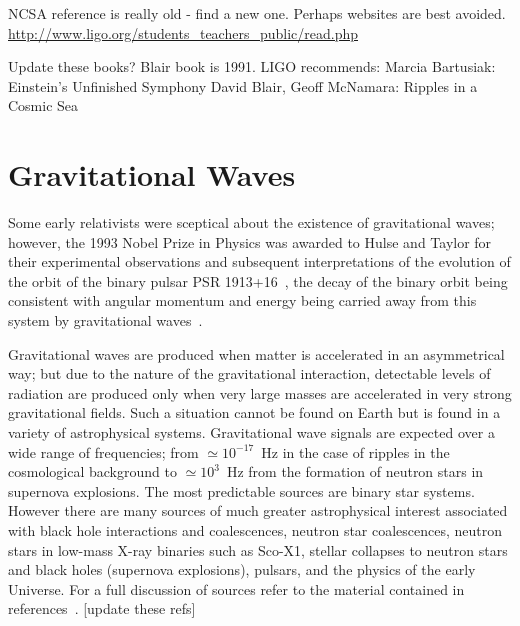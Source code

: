 \documentclass{article}
\begin{document}
NCSA reference is really old - find a new one. Perhaps websites are best avoided.
\url{http://www.ligo.org/students_teachers_public/read.php}

Update these books?  Blair book is 1991.  LIGO recommends:
Marcia Bartusiak: Einstein's Unfinished Symphony
David Blair, Geoff McNamara: Ripples in a Cosmic Sea


\newpage

\section{Gravitational Waves}
\label{section:gravwaves}

Some early relativists were sceptical about the existence of gravitational
waves; however, the 1993 Nobel Prize in Physics was awarded to Hulse and Taylor
for their experimental observations and subsequent interpretations of the
evolution of the orbit of the binary pulsar PSR 1913+16~\cite{Hulse, Taylor},
the decay of the binary orbit being consistent with angular momentum and energy
being carried away from this system by gravitational waves~\cite{Will}.

Gravitational waves are produced when matter is accelerated in an asymmetrical
way; but due to the nature of the gravitational interaction, detectable levels
of radiation are produced only when very large masses are accelerated in very
strong gravitational fields. Such a situation cannot be found on Earth but is
found in a variety of astrophysical systems. Gravitational wave signals are
expected over a wide range of frequencies; from $\simeq 10^{-17}$~Hz in the case
of ripples in the cosmological background to $\simeq 10^3$~Hz from the formation
of neutron stars in supernova explosions. The most predictable sources are
binary star systems. However there are many sources of much greater
astrophysical interest associated with black hole interactions and coalescences,
neutron star coalescences, neutron stars in low-mass X-ray binaries such as
Sco-X1, stellar collapses to neutron stars and black holes (supernova
explosions), pulsars, and the physics of the early Universe. For a full
discussion of sources refer to the material contained in
references~\cite{LISAsymposium, sources, Amaldiproc}. [update these refs]
\end{document}
